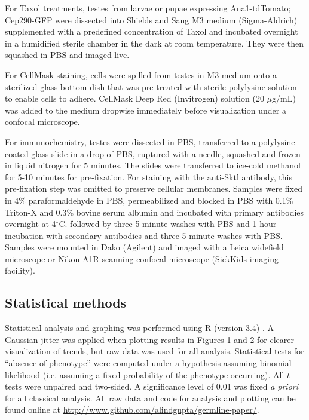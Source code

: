 \documentclass[12pt, twoside, letterpaper]{article}
\begin{document}
\begin{doublespacing}
\begin{linenumbers}
    For Taxol treatments, testes from larvae or pupae expressing
    Ana1-tdTomato; Cep290-GFP were
    dissected into Shields and Sang M3 medium (Sigma-Aldrich) supplemented
    with a predefined
    concentration of Taxol and incubated overnight in a humidified sterile
    chamber in the dark at room temperature. They were then squashed
    in PBS and imaged live.

    For CellMask staining, cells were spilled from testes in M3 medium onto
    a sterilized glass-bottom dish that was pre-treated with sterile polylysine solution
    to enable cells to adhere.
    CellMask Deep Red (Invitrogen) solution (20 $\mu$g/mL) was added to the medium dropwise
    immediately before visualization under a confocal microscope.

    For immunochemistry, testes were dissected in PBS,
    transferred to a polylysine-coated glass slide in a drop of PBS,
    ruptured with a needle, squashed and frozen in liquid nitrogen for 5 minutes.
    The slides were transferred to ice-cold methanol for 5-10 minutes for pre-fixation.
    For staining with the anti-Sktl antibody, this pre-fixation step
    was omitted to preserve cellular membranes.
    Samples were fixed in 4\% paraformaldehyde in PBS,
    permeabilized and blocked in PBS with 0.1\% Triton-X and 0.3\% bovine
    serum albumin and incubated with primary antibodies overnight at 4$^{\circ}$C.
    followed by three 5-minute washes with PBS and 1 hour incubation
    with secondary antibodies and three 5-minute washes with PBS.
    Samples were mounted in Dako (Agilent) and imaged with
    a Leica widefield microscope
    or Nikon A1R scanning confocal microscope (SickKids imaging facility).

    \subsection{Statistical methods}
    Statistical analysis and graphing was performed using R (version 3.4)
    \citep{r}.
    A Gaussian jitter was applied when plotting
    results in Figures 1 and 2 for clearer visualization of trends,
    but raw data was used for all analysis.
    Statistical tests for ``absence of phenotype'' were computed under a
    hypothesis assuming binomial likelihood (i.e. assuming a fixed probability of the
    phenotype occurring).
    All $t$-tests were unpaired and two-sided.
    A significance level of 0.01 was fixed \textit{a priori} for all classical analysis.
    All raw data and code for analysis and plotting can be found online
    at \url{http://www.github.com/alindgupta/germline-paper/}.


\end{linenumbers}
\end{doublespacing}
\end{document}
